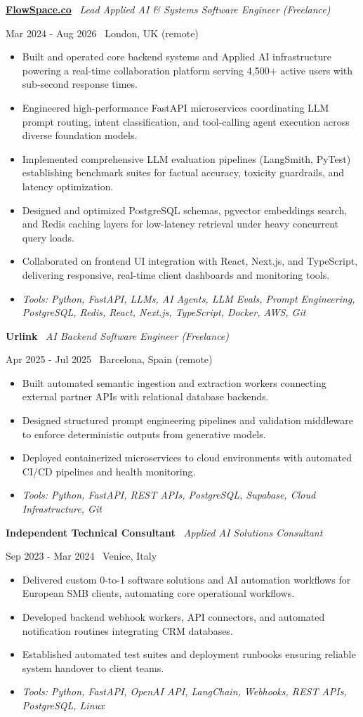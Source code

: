 \documentclass[a4paper,10pt]{article}
\newcommand{\role}[4]{%
  \vspace{2pt}\noindent
  \begin{minipage}[t]{0.70\textwidth}\raggedright\textbf{#1} \textbullet\ \textit{#3}\end{minipage}%
  \hfill
  \begin{minipage}[t]{0.28\textwidth}\raggedleft\footnotesize\color{gray}#2 \textbullet\ #4\end{minipage}%
  \vspace{1pt}%
}
\begin{document}
\role{\href{https://flowspace.co}{FlowSpace.co}}{Mar 2024 - Aug 2026}{Lead Applied AI \& Systems Software Engineer (Freelance)}{London, UK (remote)}
\begin{itemize}
  \item Built and operated core backend systems and Applied AI infrastructure powering a real-time collaboration platform serving 4,500+ active users with sub-second response times.
  \item Engineered high-performance FastAPI microservices coordinating LLM prompt routing, intent classification, and tool-calling agent execution across diverse foundation models.
  \item Implemented comprehensive LLM evaluation pipelines (LangSmith, PyTest) establishing benchmark suites for factual accuracy, toxicity guardrails, and latency optimization.
  \item Designed and optimized PostgreSQL schemas, pgvector embeddings search, and Redis caching layers for low-latency retrieval under heavy concurrent query loads.
  \item Collaborated on frontend UI integration with React, Next.js, and TypeScript, delivering responsive, real-time client dashboards and monitoring tools.
  \item \textit{Tools: Python, FastAPI, LLMs, AI Agents, LLM Evals, Prompt Engineering, PostgreSQL, Redis, React, Next.js, TypeScript, Docker, AWS, Git}
\end{itemize}

\role{Urlink}{Apr 2025 - Jul 2025}{AI Backend Software Engineer (Freelance)}{Barcelona, Spain (remote)}
\begin{itemize}
  \item Built automated semantic ingestion and extraction workers connecting external partner APIs with relational database backends.
  \item Designed structured prompt engineering pipelines and validation middleware to enforce deterministic outputs from generative models.
  \item Deployed containerized microservices to cloud environments with automated CI/CD pipelines and health monitoring.
  \item \textit{Tools: Python, FastAPI, REST APIs, PostgreSQL, Supabase, Cloud Infrastructure, Git}
\end{itemize}

\role{Independent Technical Consultant}{Sep 2023 - Mar 2024}{Applied AI Solutions Consultant}{Venice, Italy}
\begin{itemize}
  \item Delivered custom 0-to-1 software solutions and AI automation workflows for European SMB clients, automating core operational workflows.
  \item Developed backend webhook workers, API connectors, and automated notification routines integrating CRM databases.
  \item Established automated test suites and deployment runbooks ensuring reliable system handover to client teams.
  \item \textit{Tools: Python, FastAPI, OpenAI API, LangChain, Webhooks, REST APIs, PostgreSQL, Linux}
\end{itemize}
\end{document}
